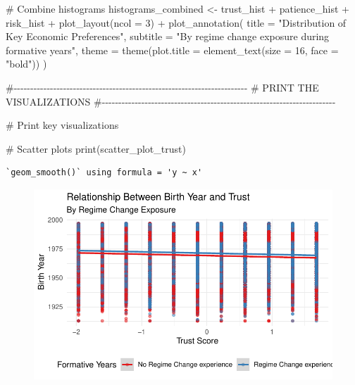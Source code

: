\documentclass[
  letterpaper,
  DIV=11,
  numbers=noendperiod]{scrartcl}
\newenvironment{Shaded}{\begin{snugshade}}{\end{snugshade}}
\newcommand{\AttributeTok}[1]{\textcolor[rgb]{0.40,0.45,0.13}{#1}}
\newcommand{\CommentTok}[1]{\textcolor[rgb]{0.37,0.37,0.37}{#1}}
\newcommand{\DecValTok}[1]{\textcolor[rgb]{0.68,0.00,0.00}{#1}}
\newcommand{\FunctionTok}[1]{\textcolor[rgb]{0.28,0.35,0.67}{#1}}
\newcommand{\NormalTok}[1]{\textcolor[rgb]{0.00,0.23,0.31}{#1}}
\newcommand{\OtherTok}[1]{\textcolor[rgb]{0.00,0.23,0.31}{#1}}
\newcommand{\SpecialCharTok}[1]{\textcolor[rgb]{0.37,0.37,0.37}{#1}}
\newcommand{\StringTok}[1]{\textcolor[rgb]{0.13,0.47,0.30}{#1}}
\begin{document}
\begin{Shaded}
\begin{Highlighting}[]
\CommentTok{\# Combine histograms}
\NormalTok{histograms\_combined }\OtherTok{\textless{}{-}}\NormalTok{ trust\_hist }\SpecialCharTok{+}\NormalTok{ patience\_hist }\SpecialCharTok{+}\NormalTok{ risk\_hist }\SpecialCharTok{+}
  \FunctionTok{plot\_layout}\NormalTok{(}\AttributeTok{ncol =} \DecValTok{3}\NormalTok{) }\SpecialCharTok{+}
  \FunctionTok{plot\_annotation}\NormalTok{(}
    \AttributeTok{title =} \StringTok{"Distribution of Key Economic Preferences"}\NormalTok{,}
    \AttributeTok{subtitle =} \StringTok{"By regime change exposure during formative years"}\NormalTok{,}
    \AttributeTok{theme =} \FunctionTok{theme}\NormalTok{(}\AttributeTok{plot.title =} \FunctionTok{element\_text}\NormalTok{(}\AttributeTok{size =} \DecValTok{16}\NormalTok{, }\AttributeTok{face =} \StringTok{"bold"}\NormalTok{))}
\NormalTok{  )}



\CommentTok{\#{-}{-}{-}{-}{-}{-}{-}{-}{-}{-}{-}{-}{-}{-}{-}{-}{-}{-}{-}{-}{-}{-}{-}{-}{-}{-}{-}{-}{-}{-}{-}{-}{-}{-}{-}{-}{-}{-}{-}{-}{-}{-}{-}{-}{-}{-}{-}{-}{-}{-}{-}{-}{-}{-}{-}{-}{-}{-}{-}{-}{-}{-}{-}{-}{-}{-}{-}{-}{-}{-}{-}}
\CommentTok{\# PRINT THE VISUALIZATIONS}
\CommentTok{\#{-}{-}{-}{-}{-}{-}{-}{-}{-}{-}{-}{-}{-}{-}{-}{-}{-}{-}{-}{-}{-}{-}{-}{-}{-}{-}{-}{-}{-}{-}{-}{-}{-}{-}{-}{-}{-}{-}{-}{-}{-}{-}{-}{-}{-}{-}{-}{-}{-}{-}{-}{-}{-}{-}{-}{-}{-}{-}{-}{-}{-}{-}{-}{-}{-}{-}{-}{-}{-}{-}{-}}

\CommentTok{\# Print key visualizations}

\CommentTok{\# Scatter plots}
\FunctionTok{print}\NormalTok{(scatter\_plot\_trust)}
\end{Highlighting}
\end{Shaded}

\begin{verbatim}
`geom_smooth()` using formula = 'y ~ x'
\end{verbatim}

\begin{figure}[H]

{\centering \includegraphics{Milestone-2-Data_files/figure-pdf/unnamed-chunk-9-1.pdf}

}

\end{figure}
\end{document}
